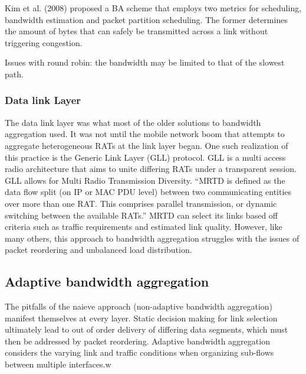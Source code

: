 \documentclass[12pt]{article}
\begin{document}
			Kim et al. (2008) proposed a BA scheme that employs two metrics for scheduling, bandwidth estimation and packet partition scheduling. The former determines the amount of bytes that can safely be transmitted across a link without triggering congestion. 

			Issues with round robin: the bandwidth may be limited to that of the slowest path.

		\subsubsection{Data link Layer}
			The data link layer was what most of the older solutions to bandwidth aggregation used. It was not until the mobile network boom that attempts to aggregate heterogeneous RATs at the link layer began. One such realization of this practice is the Generic Link Layer (GLL) protocol. GLL is a multi access radio architecture that aims to unite differing RATs under a transparent session. GLL allows for Multi Radio Transmission Diversity.
			 ``MRTD is defined as the data flow split (on IP or MAC PDU level) between two communicating entities over more than one RAT. This comprises parallel transmission, or dynamic switching between the available RATs.''\cite{GLL:2005}
			MRTD can select its links based off criteria such as traffic requirements and estimated link quality. However, like many others, this approach to bandwidth aggregation struggles with the issues of packet reordering and unbalanced load distribution.

	\subsection{Adaptive bandwidth aggregation}
		The pitfalls of the naieve approach (non-adaptive bandwidth aggregation) manifest themselves at every layer. Static decision making for link selection ultimately lead to out of order delivery of differing data segments, which must then be addressed by packet reordering. 
		Adaptive bandwidth aggregation considers the varying link and traffic conditions when organizing sub-flows between multiple interfaces.w
\end{document}
